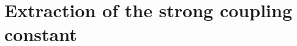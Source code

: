 \chapter{Extraction of the strong coupling constant}
\label{chap:Alphas}
\begin{comment}
The inclusive jet production measurements at hadron colliders provides a direct probe to measure the strong coupling constant \alps.
A previous measurement of \alps has been carried out from inclusive 
jet measurement at $\sqrt{s}$ = 7TeV \cite{Khachatryan:2014waa} and also from Tevatron experiments \cite{D0Alpha1, D0Alpha2}. The current analysis also broadly follows the same procedure for extraction of \alps.

The extraction of $\alps$ is performed by fitting chi-square between measured \httwo and theory prediction.

The differential inclusive jet production cross section upto at NLO is given by \cite{ALPHASCDF}:

 \begin{equation}
 \frac{d\sigma}{d(\httwo)} = \alpha_S^2(\mur)\hat{X}^{(0)}(\muf,(\httwo))[1 + \alpha_S(\mur)K1(\mur, \muf,(\httwo))] \,,
 \label{eqn:SigmaNLO}
 \end{equation}

 where $\frac{d\sigma}{d(\httwo)}$ is the differential inclusive-jet production cross section as a function of jet \httwo, \mur and
\muf are the renormalization and factorization scales set equal to jet \httwo, $\alpha_S^2(\mur)\hat{X}^{(0)}(\muf,(\httwo))$ is the
leading order contribution to the differential inclusive-jet production cross section and $\alpha_S^3(\mur)\hat{X}^{(0)}(\muf,(\httwo))K1(\mur, \muf,(\httwo))$ is the NLO contribution. Equation~\ref{eqn:SigmaNLO} shows how the inclusive jet production cross section varies with $\alpha_S(\mur)$. This NLO cross section is corrected with the electroweak correction factors and NP correction factors.

For a fixed choice of $\mur, \muf$, different input values of \alps will lead to different theory predictions of the differential cross section distribution, giving an estimate of the sensitivity of the theory predictions with varying input value of \alps. A comparison with the measured spectrum gives an estimate of the input value of \alps for which the theory distribution has the closest matching with data.

The measured inclusive 2-jet and 3-jet event cross sections can be used for a determination of the strong coupling constant
\alpsmz. In the following section, the sensitivity of the inclusive differential jet cross section and ratio, \ratio to \alpsmz
is demonstrated and the fitting procedure is explained in details before presenting the outcome of the diverse fits of \alpsmz.


\end{comment}
